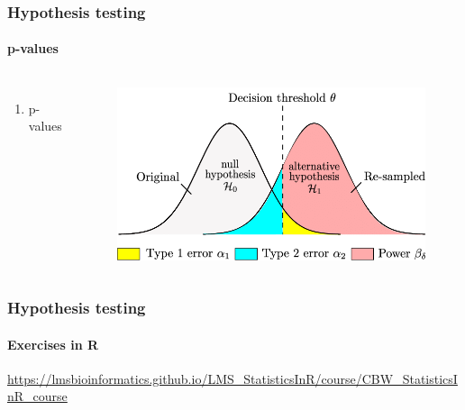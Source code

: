 \documentclass[aspectratio=43]{beamer}
\begin{document}
\begin{frame}
	
	\frametitle{Hypothesis testing}
	\framesubtitle{p-values}
	
	\footnotesize
	
	\begin{columns}
		
		
		\begin{enumerate}
			\item p-values
		\end{enumerate}
		
		
		\begin{figure}[!htb]
			\includegraphics[width = \linewidth]{plots/part3/hypothesis.png}
		\end{figure}
		
	\end{columns}

\end{frame}

\begin{frame}
	
	\frametitle{Hypothesis testing}
	\framesubtitle{Exercises in R}
	
	\footnotesize
	
	\href{https://lmsbioinformatics.github.io/LMS_StatisticsInR/course/CBW_StatisticsInR_course.html\#/54}{https://lmsbioinformatics.github.io/LMS\_StatisticsInR/course/CBW\_StatisticsInR\_course}

\end{frame}
\end{document}
